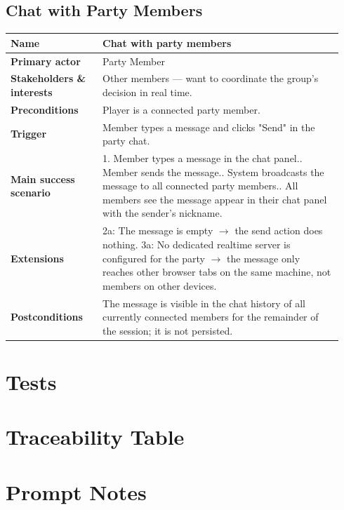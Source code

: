 \documentclass[sigconf]{acmart}
\begin{document}
\subsection*{Chat with Party Members}
{\footnotesize
\begin{supertabular}{@{}p{0.26\linewidth}p{0.68\linewidth}@{}}
\textbf{Name} & Chat with party members \\
\hline
\textbf{Primary actor} & Party Member \\
\hline
\textbf{Stakeholders \& interests} & Other members --- want to coordinate the group's decision in real time. \\
\hline
\textbf{Preconditions} & Player is a connected party member. \\
\hline
\textbf{Trigger} & Member types a message and clicks "Send" in the party chat. \\
\hline
\textbf{Main success scenario} & 1. Member types a message in the chat panel.. Member sends the message.. System broadcasts the message to all connected party members.. All members see the message appear in their chat panel with the sender's nickname. \\
\hline
\textbf{Extensions} & 2a: The message is empty $\rightarrow$ the send action does nothing.\newline
3a: No dedicated realtime server is configured for the party $\rightarrow$ the message only reaches other browser tabs on the same machine, not members on other devices. \\
\hline
\textbf{Postconditions} & The message is visible in the chat history of all currently connected members for the remainder of the session; it is not persisted. \\
\end{supertabular}
}

\section{Tests}

\section{Traceability Table}

\section{Prompt Notes}
\end{document}
